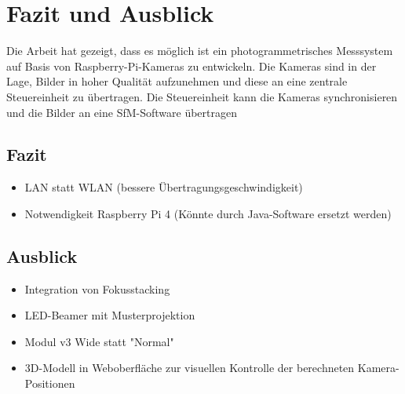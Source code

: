 \documentclass[./00PhotoBox.tex]{subfiles}
\begin{document}
\chapter{Fazit und Ausblick}

Die Arbeit hat gezeigt, dass es möglich ist ein photogrammetrisches Messsystem auf Basis von Raspberry-Pi-Kameras zu entwickeln. Die Kameras sind in der Lage, Bilder in hoher Qualität aufzunehmen und diese an eine zentrale Steuereinheit zu übertragen. Die Steuereinheit kann die Kameras synchronisieren und die Bilder an eine \gls{SfM}-Software übertragen

\section{Fazit}
\begin{itemize}
  \item LAN statt WLAN (bessere Übertragungsgeschwindigkeit)
  \item Notwendigkeit Raspberry Pi 4 (Könnte durch Java-Software ersetzt werden)
\end{itemize}

\section{Ausblick}
\label{s:ausblick}
\begin{itemize}
  \item Integration von Fokusstacking
  \item LED-Beamer mit Musterprojektion
  \item Modul v3 Wide statt "Normal"
  \item 3D-Modell in Weboberfläche zur visuellen Kontrolle der berechneten Kamera-Positionen
\end{itemize}

\biblio
\end{document}
